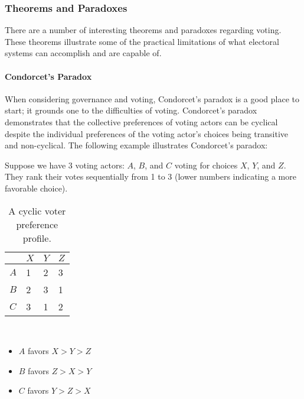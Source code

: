 \subsubsection{Theorems and Paradoxes}
There are a number of interesting theorems and paradoxes regarding voting. These
theorems illustrate some of the practical limitations of what electoral systems
can accomplish and are capable of.

\paragraph{Condorcet's Paradox}
When considering governance and voting, Condorcet's paradox is a good place to
start; it grounds one to the difficulties of voting. Condorcet's paradox
demonstrates that the collective preferences of voting actors can be cyclical
despite the individual preferences of the voting actor's choices being
transitive and non-cyclical. The following example illustrates Condorcet's
paradox:

Suppose we have 3 voting actors: $A$, $B$, and $C$ voting for choices $X$, $Y$,
and $Z$. They rank their votes sequentially from 1 to 3 (lower numbers
indicating a more favorable choice).

\begin{center}
    \begin{table}[H]
        \centering\scriptsize
        \caption{A cyclic voter preference profile.} \label{tab:condorcet-paradox}
        \begin{tabu} to 30mm{@{} X[c] | X[c] X[c] X[c] @{}}
            \toprule
            & $X$ & $Y$ & $Z$ \\
            \midrule
            $A$ & 1 & 2 & 3 \\
            $B$ & 2 & 3 & 1 \\
            $C$ & 3 & 1 & 2 \\
            \bottomrule
        \end{tabu} \\[2mm]
        \begin{varwidth}{\textwidth}
            \begin{itemize}[label=,leftmargin=0mm,topsep=5mm]
                \item $A$ favors $X > Y > Z$
                \item $B$ favors $Z > X > Y$
                \item $C$ favors $Y > Z > X$
            \end{itemize}
        \end{varwidth}
    \end{table}
\end{center}


